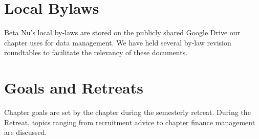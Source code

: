     \section*{Local Bylaws}
	Beta Nu's local by-laws are stored on the publicly shared Google Drive our chapter uses for data management. We have held several by-law revision roundtables to facilitate the relevancy of these documents.
	
    \section*{Goals and Retreats}	
	Chapter goals are set by the chapter during the semesterly retreat. During the Retreat, topics ranging from recruitment advice to chapter finance management are discussed. \\
	
